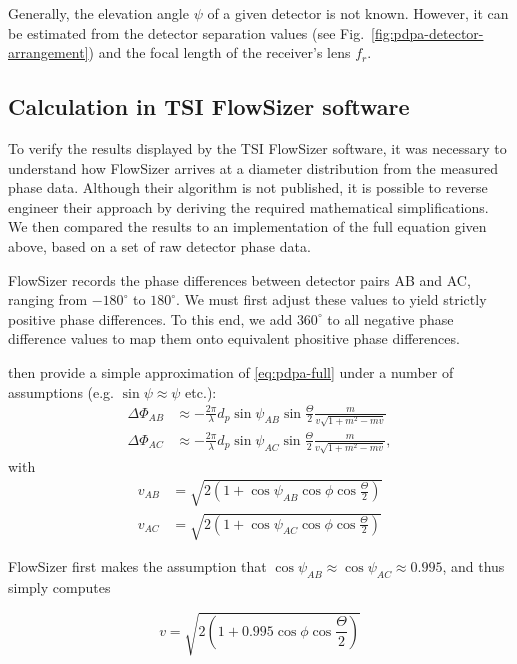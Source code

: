 \documentclass[11.5pt,oneside]{book}
\newcommand*{\figref}[1]{Fig.~\ref{#1}}
\begin{document}
Generally, the elevation angle $\psi$ of a given detector is not known. However,
it can be estimated from the detector separation values (see
\figref{fig:pdpa-detector-arrangement}) and the focal length of the receiver's
lens $f_r$.

\subsection{Calculation in TSI FlowSizer software}
To verify the results displayed by the TSI FlowSizer software, it was necessary to
understand how FlowSizer arrives at a diameter distribution from the measured
phase data. Although their algorithm is not published, it is possible to reverse
engineer their approach by deriving the required mathematical simplifications.
We then compared the results to an implementation of the full equation given
above, based on a set of raw detector phase data.

FlowSizer records the phase differences between detector pairs AB and AC,
ranging from $-180^\circ$ to $180^\circ$. We must first adjust these values to
yield strictly positive phase differences. To this end, we add $360^\circ$ to
all negative phase difference values to map them onto equivalent phositive phase
differences.

\citet{Albrecht03} then provide a simple approximation of \eqref{eq:pdpa-full}
under a number of assumptions (e.g. $\sin \psi \approx \psi$ etc.):
\begin{align}
    \Delta\Phi_{AB} &\approx -\frac{2\pi}{\lambda} d_p \sin \psi_{AB} \sin
    \frac{\Theta}{2}\frac{m}{v \sqrt{1 + m^2 - mv}}
    \label{eq:pdpa-phase-simple-ab}\\
    \Delta\Phi_{AC} &\approx -\frac{2\pi}{\lambda} d_p \sin \psi_{AC} \sin
    \frac{\Theta}{2}\frac{m}{v \sqrt{1 + m^2 - mv}}, \label{eq:pdpa-phase-simple-ac}
\end{align}
with 
\begin{align}
    v_{AB} &= \sqrt{2(1 + \cos \psi_{AB} \cos \phi \cos \frac{\Theta}{2})} \\
    v_{AC} &= \sqrt{2(1 + \cos \psi_{AC} \cos \phi \cos \frac{\Theta}{2})}
\end{align}

FlowSizer first makes the assumption that $\cos \psi_{AB} \approx \cos \psi_{AC} \approx
0.995$, and thus simply computes

\begin{equation}
    v = \sqrt{2(1 + 0.995 \cos \phi \cos \frac{\Theta}{2})}
\end{equation}
\end{document}
